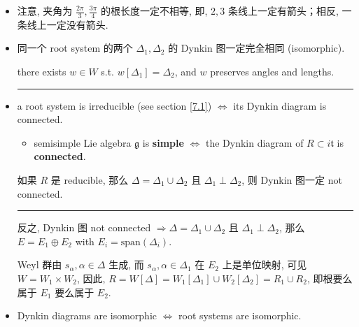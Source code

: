 \begin{itemize}
	\item 注意, 夹角为 $\frac{2 \pi}{3}, \frac{3 \pi}{4}$ 的根长度一定不相等, 即, $2, 3$ 条线上一定有箭头；相反, 一条线上一定没有箭头.
	
	\item 同一个 root system 的两个 $\Delta_1, \Delta_2$ 的 Dynkin 图一定完全相同 (isomorphic).
	
	\begin{tcolorbox}[title=proof:]
		there exists $w \in W$ s.t. $w[\Delta_1] = \Delta_2$, and $w$ preserves angles and lengths.
	\end{tcolorbox}
	
	\noindent\rule[0.5ex]{\linewidth}{0.5pt} %
	
	\item a root system is irreducible (see section \ref{7.1}) $\iff$ its Dynkin diagram is connected.
	\begin{itemize}
		\item semisimple Lie algebra $\mathfrak{g}$ is \textbf{simple} $\iff$ the Dynkin diagram of $R \subset i \mathfrak{t}$ is \textbf{connected}.
	\end{itemize}
	
	\begin{tcolorbox}[title=proof:]
		如果 $R$ 是 reducible, 那么 $\Delta = \Delta_1 \cup \Delta_2$ 且 $\Delta_1 \perp \Delta_2$, 则 Dynkin 图一定 not connected.
		
		\noindent\rule[0.5ex]{\linewidth}{0.5pt} %
		
		反之, Dynkin 图 not connected $\Longrightarrow \Delta = \Delta_1 \cup \Delta_2$ 且 $\Delta_1 \perp \Delta_2$, 那么 $E = E_1 \oplus E_2$ with $E_i = \mathrm{span}(\Delta_i)$.
		
		Weyl 群由 $s_\alpha, \alpha \in \Delta$ 生成, 而 $s_\alpha, \alpha \in \Delta_1$ 在 $E_2$ 上是单位映射, 可见 $W = W_1 \times W_2$, 因此, $R = W[\Delta] = W_1[\Delta_1] \cup W_2[\Delta_2] = R_1 \cup R_2$, 即根要么属于 $E_1$ 要么属于 $E_2$.
	\end{tcolorbox}
	
	\item Dynkin diagrams are isomorphic $\iff$ root systems are isomorphic.
\end{itemize}

